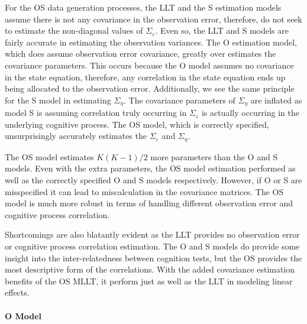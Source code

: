 \documentclass[
]{article}
\begin{document}
For the OS data generation processes, the LLT and the S estimation models assume there is not any covariance in the observation error, therefore, do not seek to estimate the non-diagonal values of \(\Sigma_\varepsilon\). Even so, the LLT and S models are fairly accurate in estimating the observation variances. The O estimation model, which does assume observation error covariance, greatly over estimates the covariance parameters. This occurs because the O model assumes no covariance in the state equation, therefore, any correlation in the state equation ends up being allocated to the observation error. Additionally, we see the same principle for the S model in estimating \(\Sigma_\eta\). The covariance parameters of \(\Sigma_\eta\) are inflated as model S is assuming correlation truly occurring in \(\Sigma_\varepsilon\) is actually occurring in the underlying cognitive process. The OS model, which is correctly specified, unsurprisingly accurately estimates the \(\Sigma_\varepsilon\) and \(\Sigma_\eta\).

The OS model estimates \(K(K-1)/2\) more parameters than the O and S models. Even with the extra parameters, the OS model estimation performed as well as the correctly specified O and S models respectively. However, if O or S are misspecified it can lead to miscalculation in the covariance matrices. The OS model is much more robust in terms of handling different observation error and cognitive process correlation.

Shortcomings are also blatantly evident as the LLT provides no observation error or cognitive process correlation estimation. The O and S models do provide some insight into the inter-relatedness between cognition tests, but the OS provides the most descriptive form of the correlations. With the added covariance estimation benefits of the OS MLLT, it perform just as well as the LLT in modeling linear effects.

\hypertarget{o-model-1}{%
\paragraph{O Model}\label{o-model-1}}
\end{document}
